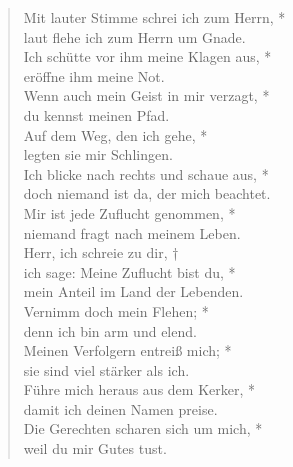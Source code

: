 \vspace{0.3cm}

\def\greinitialformat#1{{\fontsize{40}{40}\selectfont #1}}
\gresetfirstlineaboveinitial{\small \textcolor{red}{Ps 142}}{}
\setaboveinitialseparation{0.72mm}


\vspace{0.3cm}


\begin{verse}
 Mit lauter Stimme schrei ich zum Herrn, *\\ 
laut flehe ich zum Herrn um Gnade.\\ \vin
Ich schütte vor ihm meine Klagen aus, *\\ \vin
eröffne ihm meine Not.\\ 
Wenn auch mein Geist in mir verzagt, *\\ 
du kennst meinen Pfad.\\ \vin 
Auf dem Weg, den ich gehe, *\\ \vin legten sie mir Schlingen.\\  
Ich blicke nach rechts und schaue aus, *\\ 
doch niemand ist da, der mich beachtet.\\ \vin 
Mir ist jede Zuflucht genommen, *\\ \vin niemand fragt nach meinem Leben.\\ 
Herr, ich schreie zu dir, †\\
ich sage: Meine Zuflucht bist du, *\\  mein Anteil im Land der Lebenden.\\ \vin 
Vernimm doch mein Flehen; *\\ \vin
denn ich bin arm und elend.\\  
Meinen Verfolgern entreiß mich; *\\  sie sind viel stärker als ich.\\ \vin
Führe mich heraus aus dem Kerker, *\\ \vin
damit ich deinen Namen preise.\\  
Die Gerechten scharen sich um mich, *\\  weil du mir Gutes tust.\\  
\end{verse}



